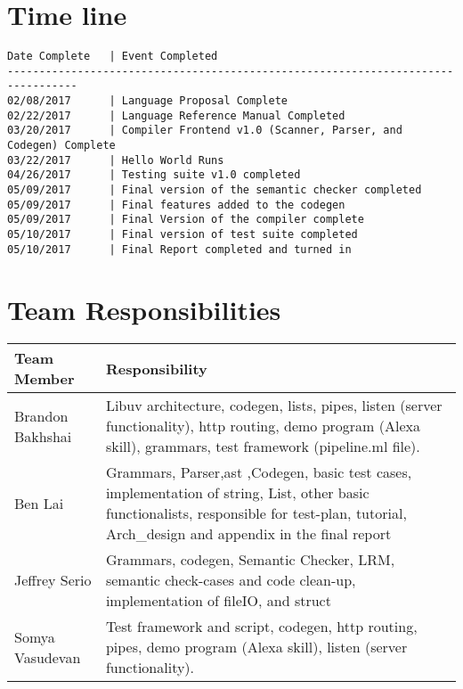 \documentclass[./Report_main.tex]{subfiles}
\begin{document}
\section{Time line}
\begin{lstlisting} 
Date Complete	| Event Completed
---------------------------------------------------------------------------------
02/08/2017		| Language Proposal Complete
02/22/2017		| Language Reference Manual Completed
03/20/2017		| Compiler Frontend v1.0 (Scanner, Parser, and Codegen) Complete
03/22/2017		| Hello World Runs
04/26/2017		| Testing suite v1.0 completed
05/09/2017		| Final version of the semantic checker completed
05/09/2017		| Final features added to the codegen
05/09/2017		| Final Version of the compiler complete
05/10/2017		| Final version of test suite completed
05/10/2017		| Final Report completed and turned in
\end{lstlisting}
\section{Team Responsibilities}
\begin{tabu} to 1\textwidth { | X[c] | X[c] | }
 \hline
 Team Member & Responsibility \\ 
 \hline
 Brandon Bakhshai & Libuv architecture, codegen, lists, pipes, listen (server functionality), http routing, demo program (Alexa skill), grammars, test framework (pipeline.ml file).
\\
 \hline
Ben Lai  & Grammars, Parser,ast ,Codegen, basic test cases, implementation of string, List, other basic functionalists, responsible for test-plan, tutorial, Arch_design and appendix in the final report  \\
 \hline
Jeffrey Serio  & Grammars, codegen, Semantic Checker, LRM, semantic check-cases and code clean-up, implementation of fileIO, and struct
\\
\hline
Somya Vasudevan & Test framework and script, codegen, http routing, pipes, demo program (Alexa skill), listen (server functionality).\\
\hline
\end{tabu}
\end{document}
